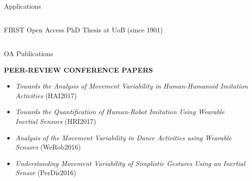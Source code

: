 {{\begin{frame}{Applications}
    \begin{figure}
   \end{figure}
	
\end{frame}
}



\subsection{}
{

\begin{frame}{FIRST Open Access PhD Thesis at UoB (since 1901)}
    \begin{figure}
   \end{figure}
	
\end{frame}
}





\subsection{}
{

\begin{frame}{OA Publications}

\tiny
 
\textbf{PEER-REVIEW CONFERENCE PAPERS}
\begin{itemize}	
	\item \textit{Towards the Analysis of Movement Variability in Human-Humanoid Imitation Activities} 
	(HAI2017) 
	\item \textit{Towards the Quantification of Human-Robot Imitation Using Wearable Inertial Sensors} (HRI2017)
	\item \textit{Analysis of the Movement Variability in Dance Activities using Wearable Sensors} (WeRob2016)
	\item \textit{Understanding Movement Variability of Simplistic Gestures Using an Inertial Sensor} (PerDis2016)
\end{itemize}


\end{frame}}}
